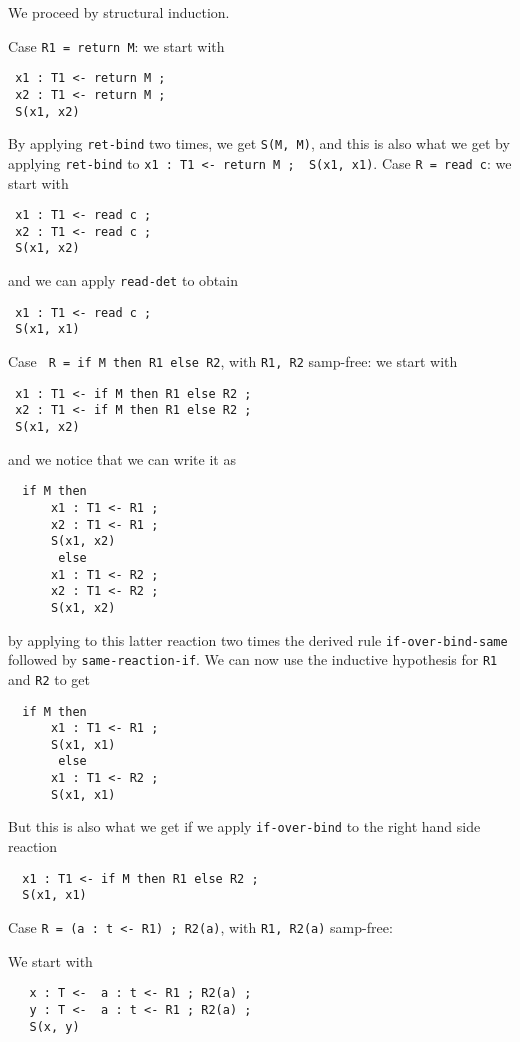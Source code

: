 \documentclass{article}
\begin{document}
\begin{itemize}
 We proceed by structural induction.

 Case \verb+R1 = return M+:
 we start with
 \begin{lstlisting}
 x1 : T1 <- return M ; 
 x2 : T1 <- return M ; 
 S(x1, x2)
 \end{lstlisting}
 By applying \verb+ret-bind+ two times, we get \verb+S(M, M)+, and this
 is also what we get by applying \verb+ret-bind+ to \verb+x1 : T1 <- return M ;  S(x1, x1)+.
 Case \verb+R = read c+:
 we start with 
  \begin{lstlisting}
 x1 : T1 <- read c ; 
 x2 : T1 <- read c ; 
 S(x1, x2)
 \end{lstlisting}
 \noindent and we can apply \verb+read-det+ to obtain
   \begin{lstlisting}
 x1 : T1 <- read c ; 
 S(x1, x1)
 \end{lstlisting}
 
 Case \verb+ R = if M then R1 else R2+, with \verb+R1, R2+ samp-free:
 we start with 
   \begin{lstlisting}
 x1 : T1 <- if M then R1 else R2 ; 
 x2 : T1 <- if M then R1 else R2 ; 
 S(x1, x2)
 \end{lstlisting} 
 and we notice that we can write it as
   \begin{lstlisting}
  if M then 
      x1 : T1 <- R1 ;
      x2 : T1 <- R1 ; 
      S(x1, x2)  
       else
      x1 : T1 <- R2 ;
      x2 : T1 <- R2 ; 
      S(x1, x2) 
 \end{lstlisting}
 by applying to this latter reaction two times the derived rule 
 \verb+if-over-bind-same+ followed by \verb+same-reaction-if+.
 We can now use the inductive hypothesis for \verb+R1+ and \verb+R2+ to get
   \begin{lstlisting}
  if M then 
      x1 : T1 <- R1 ;
      S(x1, x1)  
       else
      x1 : T1 <- R2 ; 
      S(x1, x1) 
 \end{lstlisting}
 But this is also what we get if we apply \verb+if-over-bind+ to
 the right hand side reaction
    \begin{lstlisting}
  x1 : T1 <- if M then R1 else R2 ;
  S(x1, x1)  
   \end{lstlisting}

 
 Case \verb+R = (a : t <- R1) ; R2(a)+, with \verb+R1, R2(a)+ samp-free:
 

We start with
  \begin{lstlisting}
   x : T <-  a : t <- R1 ; R2(a) ;
   y : T <-  a : t <- R1 ; R2(a) ;
   S(x, y)
  \end{lstlisting}


\end{itemize}
\end{document}
